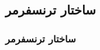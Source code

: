 \documentclass[xcolor=dvipsnames, professionalfonts, aspectratio=169, 11pt]{beamer}
\begin{document}
\begin{persian}
\begin{frame}
	
	
	
\end{frame}








\subsection{ساختار ترنسفرمر}
\begin{frame}
	\frametitle{ساختار ترنسفرمر \cite{vaswani2017attention}}
	
	\begin{multicols}{2}
		

\end{multicols}
\end{frame}
\end{persian}
\end{document}
